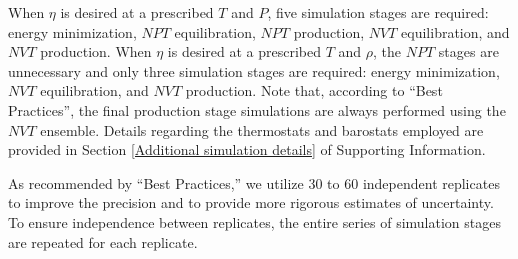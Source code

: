\documentclass[preprint,review,12pt]{elsarticle}
\begin{document}

	
	When $\eta$ is desired at a prescribed $T$ and $P$, five simulation stages are required: energy minimization, $NPT$ equilibration, $NPT$ production, $NVT$ equilibration, and $NVT$ production. When $\eta$ is desired at a prescribed $T$ and $\rho$, the $NPT$ stages are unnecessary and only three simulation stages are required: energy minimization, $NVT$ equilibration, and $NVT$ production. Note that, according to ``Best Practices'', the final production stage simulations are always performed using the $NVT$ ensemble. Details regarding the thermostats and barostats employed are provided in Section \ref{Additional simulation details} of Supporting Information.
	
	As recommended by ``Best Practices,'' we utilize 30 to 60 independent replicates to improve the precision and to provide more rigorous estimates of uncertainty. To ensure independence between replicates, the entire series of simulation stages are repeated for each replicate. 
	
\end{document}
